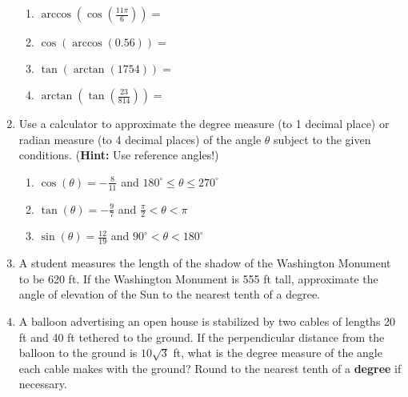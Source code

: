 \begin{enumerate}
\begin{enumerate}
\item $\arccos \left(\cos\left(\frac{11\pi}{6}\right)\right)=$
\vfill


\item $\cos \left(\arccos\left( 0.56 \right)\right) = $
\vfill

\item $\tan \left( \arctan\left(1754\right) \right)=$
\vfill

\item $\arctan \left( \tan\left( \frac{23}{814}\right)\right)=$
\vfill

\end{enumerate}


\clearpage

\item Use a calculator to approximate the degree measure (to 1 decimal place) or radian measure (to 4 decimal places) of the angle $\theta$ subject to the given conditions. (\textbf{Hint:  }Use reference angles!)

\begin{enumerate}
\item $\displaystyle \cos(\theta)=-\frac{8}{11}$ and $180^\circ \leq \theta \leq 270^\circ$
\vfill
\item $\displaystyle \tan(\theta)=-\frac{9}{7}$ and $\frac{\pi}{2}<\theta< \pi$
\vfill
\item $\displaystyle \sin(\theta)=\frac{12}{19}$ and $90^\circ < \theta <180^\circ$
\vfill
\end{enumerate}


\clearpage



\item A student measures the length of the shadow of the Washington
  Monument to be 620 ft. If the Washington Monument is 555 ft tall,
  approximate the angle of elevation of the Sun to the nearest tenth
  of a degree.

  \vfill

\item A balloon advertising an open house is stabilized by two cables
  of lengths 20 ft and 40 ft tethered to the ground.  If the
  perpendicular distance from the balloon to the ground is
  $10\sqrt{3}$ ft, what is the degree measure of the angle each cable
  makes with the ground?  Round to the nearest tenth of a
  \textbf{degree} if necessary.

  \vfill


\end{enumerate}
